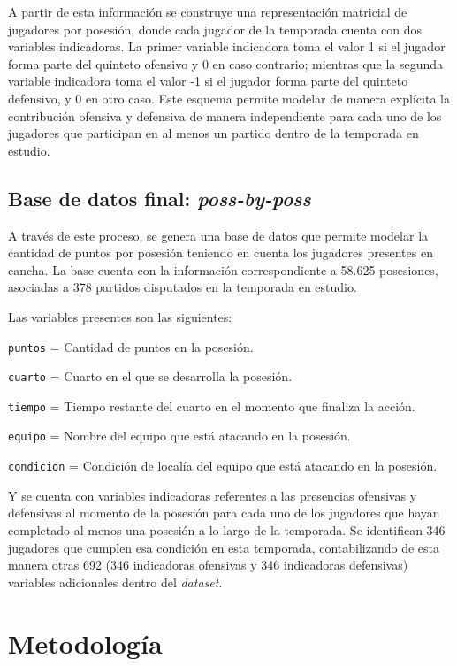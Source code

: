 \documentclass[
  12pt,
]{article}
\begin{document}
A partir de esta información se construye una representación matricial
de jugadores por posesión, donde cada jugador de la temporada cuenta con
dos variables indicadoras. La primer variable indicadora toma el valor 1
si el jugador forma parte del quinteto ofensivo y 0 en caso contrario;
mientras que la segunda variable indicadora toma el valor -1 si el
jugador forma parte del quinteto defensivo, y 0 en otro caso. Este
esquema permite modelar de manera explícita la contribución ofensiva y
defensiva de manera independiente para cada uno de los jugadores que
participan en al menos un partido dentro de la temporada en estudio.

\subsection{\texorpdfstring{Base de datos final:
\emph{poss-by-poss}}{Base de datos final: poss-by-poss}}\label{base-de-datos-final-poss-by-poss}

A través de este proceso, se genera una base de datos que permite
modelar la cantidad de puntos por posesión teniendo en cuenta los
jugadores presentes en cancha. La base cuenta con la información
correspondiente a 58.625 posesiones, asociadas a 378 partidos disputados
en la temporada en estudio.

Las variables presentes son las siguientes:

\texttt{puntos} = Cantidad de puntos en la posesión.

\texttt{cuarto} = Cuarto en el que se desarrolla la posesión.

\texttt{tiempo} = Tiempo restante del cuarto en el momento que finaliza
la acción.

\texttt{equipo} = Nombre del equipo que está atacando en la posesión.

\texttt{condicion} = Condición de localía del equipo que está atacando
en la posesión.

Y se cuenta con variables indicadoras referentes a las presencias
ofensivas y defensivas al momento de la posesión para cada uno de los
jugadores que hayan completado al menos una posesión a lo largo de la
temporada. Se identifican 346 jugadores que cumplen esa condición en
esta temporada, contabilizando de esta manera otras 692 (346 indicadoras
ofensivas y 346 indicadoras defensivas) variables adicionales dentro del
\emph{dataset}.

\newpage

\section{Metodología}\label{cap:metodologia}
\end{document}
